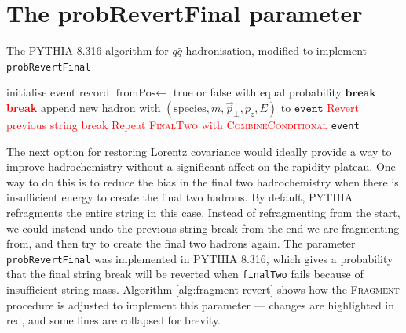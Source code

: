 \documentclass[12pt,a4paper]{report}
\begin{document}
\section{The probRevertFinal parameter}
\begin{algorithm}
  \caption{The PYTHIA 8.316 algorithm for $q\bar{q}$ hadronisation, modified to implement \texttt{probRevertFinal}}
  \label{alg:fragment-revert}
  \begin{algorithmic}
      \Repeat
        \State initialise event record
        \Loop
          \State $\text{fromPos} \gets$ true or false with equal probability 
          \Repeat
            \State $\textbf{break}$
          \EndIf
            \State \textcolor{red}{\textbf{break}}
          \EndIf
          \State $\text{append new hadron with } (\text{species}, m, \vec{p}_\perp, p_z, E) \text{ to } \texttt{event}$
      \EndLoop
        \State \textcolor{red}{Revert previous string break}
        \State \textcolor{red}{Repeat \textsc{FinalTwo} with \textsc{CombineConditional}}
      \EndIf
    \State \Return \texttt{event}
    \EndProcedure
  \end{algorithmic}
\end{algorithm}

The next option for restoring Lorentz covariance would ideally provide a way to improve hadrochemistry without a significant affect on the rapidity plateau. One way to do this is to reduce the bias in the final two hadrochemistry when there is insufficient energy to create the final two hadrons. By default, PYTHIA refragments the entire string in this case. Instead of refragmenting from the start, we could instead undo the previous string break from the end we are fragmenting from, and then try to create the final two hadrons again. The parameter \texttt{probRevertFinal} was implemented in PYTHIA 8.316, which gives a probability that the final string break will be reverted when \texttt{finalTwo} fails because of insufficient string mass. Algorithm \ref{alg:fragment-revert} shows how the \textsc{Fragment} procedure is adjusted to implement this parameter --- changes are highlighted in red, and some lines are collapsed for brevity.
\end{document}
